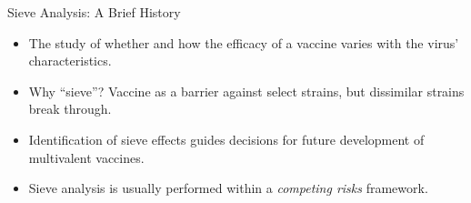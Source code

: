 \documentclass[12pt,t]{beamer}
\begin{document}
\begin{frame}[c]{Sieve Analysis: A Brief History}

\begin{center}
\begin{itemize}
  \itemsep10pt
  \item The study of whether and how the efficacy of a vaccine varies with the
    virus' characteristics.
  \item Why ``sieve''? Vaccine as a barrier against select strains, but
    dissimilar strains break through.
  \item Identification of sieve effects guides decisions for future development
    of multivalent vaccines.
  \item Sieve analysis is usually performed within a \textit{competing risks}
    framework.
\end{itemize}
\end{center}


\end{frame}

\end{document}
